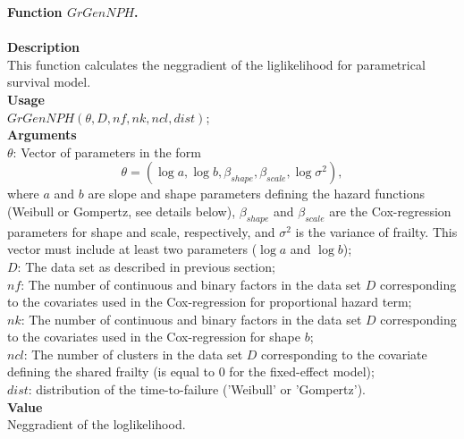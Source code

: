 \documentclass[A4document,12pt]{article}\usepackage[]{graphicx}\usepackage[]{color}
\begin{document}
\noindent
{\textbf{Function $GrGenNPH$.}}
\\\\
\noindent
\textbf{Description}\\
This function calculates the neggradient of the liglikelihood for parametrical survival model.\\
\textbf{Usage}\\
$GrGenNPH(\theta,D,nf,nk,ncl,dist)$;\\
\textbf{Arguments}
\\
\noindent
$\theta$:  Vector of parameters in the form 
\[\theta=(\log a,\log b,\beta _{shape},\beta _{scale},\log \sigma ^2),\]
where $a$ and $b$ are slope and shape parameters defining the hazard functions (Weibull or Gompertz, see details below), $\beta _{shape}$ and $\beta _{scale}$ are the Cox-regression parameters for shape and scale, respectively, and $\sigma ^2$ is the variance of frailty. This vector must include at least two parameters ($\log a$ and $\log b$); 
\\
\noindent
$D$:  The data set as described in previous section;\\
\noindent
$nf$:       The number of continuous and binary factors in the data set $D$ corresponding to the covariates used in the Cox-regression for proportional hazard term;\\
\noindent
$nk$:        The number of continuous and binary factors in the data set $D$ corresponding to the covariates used in the Cox-regression for shape $b$;\\
\noindent
$ncl$:       The number of clusters in the data set $D$ corresponding to the covariate defining the shared frailty (is equal to 0 for the fixed-effect model);\\
\noindent
$dist$:   distribution of the time-to-failure ('Weibull' or 'Gompertz').\\
\textbf{Value}\\
Neggradient of the loglikelihood.\\
\end{document}
